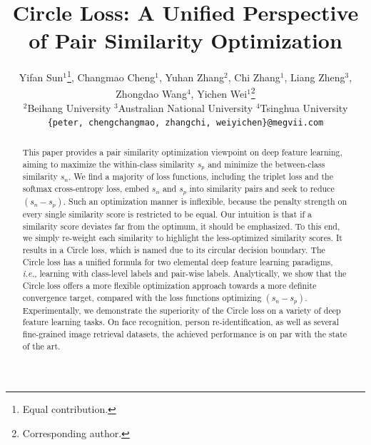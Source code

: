 \documentclass[10pt,twocolumn,letterpaper]{article}
\begin{document}
\title{Circle Loss: A Unified Perspective of Pair Similarity Optimization}
\newcommand*\samethanks[1][\value{footnote}]{\footnotemark[#1]}
\author{%
{\fontsize{10.5}{12.6}\selectfont Yifan Sun$^1$\thanks{Equal contribution.}, Changmao Cheng$^1$\samethanks, Yuhan Zhang$^2$\samethanks, Chi Zhang$^1$, Liang Zheng$^3$, Zhongdao Wang$^4$, Yichen Wei$^1$\thanks{Corresponding author.}}\\
{\fontsize{10.5}{12.6}\selectfont {$^1$MEGVII Technology}
{$^2$Beihang University }
{$^3$Australian National University }
{$^4$Tsinghua University}}\\
{\texttt{\small{\{peter, chengchangmao, zhangchi, weiyichen\}@megvii.com}} \hspace{0.5cm}}\\
}
\maketitle
\thispagestyle{empty}

\begin{abstract}
This paper provides a pair similarity optimization viewpoint on deep feature learning, aiming to maximize the within-class similarity $s_p$ and minimize the between-class similarity $s_n$. We find a majority of loss functions, including the triplet loss and the softmax cross-entropy loss, embed $s_n$ and $s_p$ into similarity pairs and seek to reduce $(s_n-s_p)$. Such an optimization manner is inflexible, because the penalty strength on every single similarity score is restricted to be equal. Our intuition is that if a similarity score deviates far from the optimum, it should be emphasized. 
To this end, we simply re-weight each similarity to highlight the less-optimized similarity scores. It results in a Circle loss, which is named due to its circular decision boundary. The Circle loss has a unified formula for two elemental deep feature learning paradigms, \emph {i.e.}, learning with class-level labels and pair-wise labels. Analytically, we show that the Circle loss offers a more flexible optimization approach towards a more definite convergence target, compared with the loss functions optimizing $(s_n-s_p)$. Experimentally, we demonstrate the superiority of the Circle loss on a variety of deep feature learning tasks. On face recognition, person re-identification, as well as several fine-grained image retrieval datasets, the achieved performance is on par with the state of the art.
 
\end{abstract}
\end{document}
